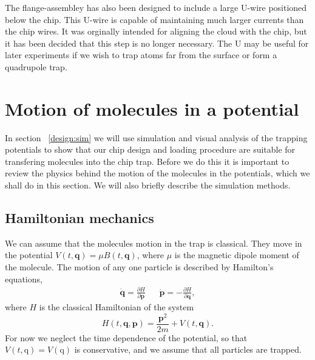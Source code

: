 \begin{figure}[h]
\vspace{0.8cm}
\centering
  \caption{}
  \label{design:fig:chip}
\end{figure}

The flange-assembley  has also been designed to include a
large U-wire positioned below the chip. This U-wire is capable of maintaining
much larger currents than the chip wires. It was orginally intended for
aligning the cloud with the chip, but it has been decided that this step is no
longer necessary. The U may be useful for later experiments if we wish to trap
atoms far from the surface or form a quadrupole trap.

\section{Motion of molecules in a potential}

In section ~\ref{design:sim} we will use simulation and visual analysis of the
trapping potentials to show that our chip design and loading procedure are
suitable for transfering molecules into the chip trap. Before we do this it is
important to review the physics behind the motion of the molecules in the
potentials, which we shall do in this section. We will also briefly describe
the simulation methods.

\subsection{Hamiltonian mechanics}

We can assume that the molecules motion in the trap is classical. They move in
the potential $V(t, \mathbf{q}) = \mu B(t, \mathbf{q})$, where $\mu$ is the
magnetic dipole moment of the molecule.  The motion of any one particle is
described by Hamilton's equations,~\cite{Lichtenberg1969}
%
\begin{align}
  \label{design:eq:hamilton}
  \dot{\mathbf{q}} =  \frac{\partial H}{\partial \mathbf{p}} &&
  \dot{\mathbf{p}} = -\frac{\partial H}{\partial \mathbf{q}},
\end{align}
%
where $H$ is the classical Hamiltonian of the system
\begin{equation}
  H(t, \mathbf{q}, \mathbf{p}) = \frac{\mathbf{p}^2}{2m} + V(t, \mathbf{q}).
\end{equation}
For now we neglect the time dependence of the potential, so that $V(t,
\mathrm{q}) = V(\mathrm{q})$ is conservative, and we assume that all particles
are trapped.

